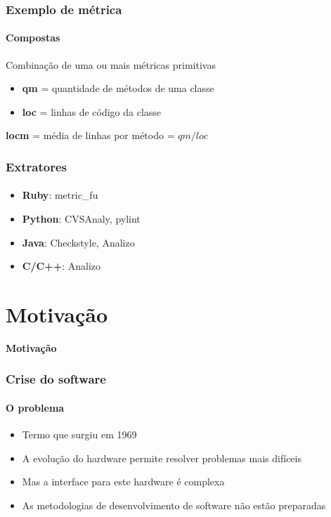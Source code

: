 \documentclass{beamer}
\begin{document}
  \begin{frame}
    \frametitle{Exemplo de métrica}
    \framesubtitle{Compostas}

    Combinação de uma ou mais métricas primitivas

    \begin{itemize}
      \item \textbf{qm} = quantidade de métodos de uma classe
      \item \textbf{loc} = linhas de código da classe
    \end{itemize}

    \textbf{locm} = média de linhas por método = $qm / loc$
  \end{frame}

  \begin{frame}
    \frametitle{Extratores}
    \framesubtitle{}

    \begin{itemize}
      \item \textbf{Ruby}: metric\_fu
      \item \textbf{Python}: CVSAnaly, pylint
      \item \textbf{Java}: Checkstyle, Analizo
      \item \textbf{C/C++}: Analizo
    \end{itemize}
  \end{frame}

\section{Motivação}
\begin{frame}
  \LARGE{\textbf{Motivação}}
\end{frame}

\begin{frame}
  \frametitle{Crise do software}
  \framesubtitle{O problema}

  \begin{itemize}
    \item Termo que surgiu em 1969
    \item A evolução do hardware permite resolver problemas mais difíceis
    \item Mas a interface para este hardware é complexa
    \item As metodologias de desenvolvimento de software não estão preparadas
  \end{itemize}
\end{frame}
\end{document}
